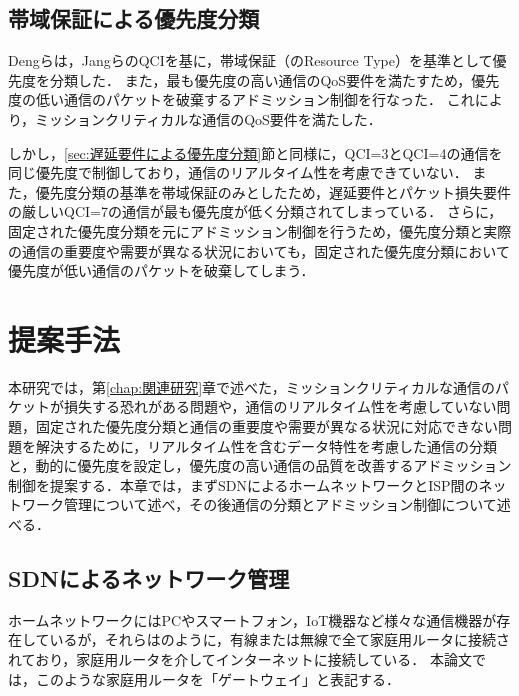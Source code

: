 \documentclass[a4paper,11pt,uplatex]{ujreport}
\begin{document}
\section{帯域保証による優先度分類}
\label{sec:帯域保証による優先度分類}

  Dengらは，JangらのQCIを基に，帯域保証（のResource Type）を基準として優先度を分類した\cite{AQRA}．
  また，最も優先度の高い通信のQoS要件を満たすため，優先度の低い通信のパケットを破棄するアドミッション制御を行なった．
  これにより，ミッションクリティカルな通信のQoS要件を満たした．\par
  しかし，\ref{sec:遅延要件による優先度分類}節と同様に，QCI=3とQCI=4の通信を同じ優先度で制御しており，通信のリアルタイム性を考慮できていない．
  また，優先度分類の基準を帯域保証のみとしたため，遅延要件とパケット損失要件の厳しいQCI=7の通信が最も優先度が低く分類されてしまっている．
  さらに，固定された優先度分類を元にアドミッション制御を行うため，優先度分類と実際の通信の重要度や需要が異なる状況においても，固定された優先度分類において優先度が低い通信のパケットを破棄してしまう．

\chapter{提案手法}
\label{chap:提案手法}

  本研究では，第\ref{chap:関連研究}章で述べた，ミッションクリティカルな通信のパケットが損失する恐れがある問題や，通信のリアルタイム性を考慮していない問題，固定された優先度分類と通信の重要度や需要が異なる状況に対応できない問題を解決するために，リアルタイム性を含むデータ特性を考慮した通信の分類と，動的に優先度を設定し，優先度の高い通信の品質を改善するアドミッション制御を提案する．本章では，まずSDNによるホームネットワークとISP間のネットワーク管理について述べ，その後通信の分類とアドミッション制御について述べる．

\section{SDNによるネットワーク管理}
\label{sec:SDNによるネットワーク管理}

  ホームネットワークにはPCやスマートフォン，IoT機器など様々な通信機器が存在しているが，それらはのように，有線または無線で全て家庭用ルータに接続されており，家庭用ルータを介してインターネットに接続している．
  本論文では，このような家庭用ルータを「ゲートウェイ」と表記する．
\end{document}
